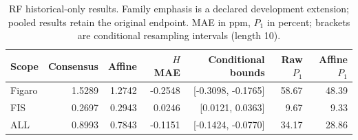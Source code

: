 \begin{table}[H]\centering\small
\caption{RF historical-only results. Family emphasis is a declared development extension; pooled results retain the original endpoint. MAE in ppm, $P_1$ in percent; brackets are conditional resampling intervals (length 10).}\label{tab:historical}
\setlength{\tabcolsep}{4pt}\begin{tabular}{lrrrrrr}
\toprule
Scope & Consensus & Affine & $H$ MAE & Conditional bounds & Raw $P_1$ & Affine $P_1$ \\ \midrule
Figaro & 1.5289 & 1.2742 & -0.2548 & [-0.3098, -0.1765] & 58.67 & 48.39 \\
FIS & 0.2697 & 0.2943 & 0.0246 & [0.0121, 0.0363] & 9.67 & 9.33 \\
ALL & 0.8993 & 0.7843 & -0.1151 & [-0.1424, -0.0770] & 34.17 & 28.86 \\
\bottomrule\end{tabular}\end{table}
